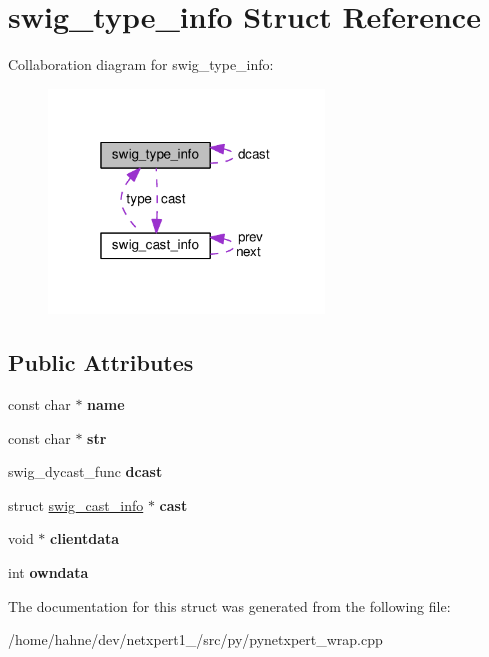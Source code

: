 \hypertarget{structswig__type__info}{}\section{swig\+\_\+type\+\_\+info Struct Reference}
\label{structswig__type__info}


Collaboration diagram for swig\+\_\+type\+\_\+info\+:\nopagebreak
\begin{figure}[H]
\begin{center}
\leavevmode
\includegraphics[width=208pt]{structswig__type__info__coll__graph}
\end{center}
\end{figure}
\subsection*{Public Attributes}
\begin{DoxyCompactItemize}
\item 
const char $\ast$ {\bfseries name}\hypertarget{structswig__type__info_a90a9c6a25aa3e923978005ecbe23ad60}{}\label{structswig__type__info_a90a9c6a25aa3e923978005ecbe23ad60}

\item 
const char $\ast$ {\bfseries str}\hypertarget{structswig__type__info_abbe7cc58a083feb4329b748643324064}{}\label{structswig__type__info_abbe7cc58a083feb4329b748643324064}

\item 
swig\+\_\+dycast\+\_\+func {\bfseries dcast}\hypertarget{structswig__type__info_a07df4bedf85be77b23756b531b60e0dd}{}\label{structswig__type__info_a07df4bedf85be77b23756b531b60e0dd}

\item 
struct \hyperlink{structswig__cast__info}{swig\+\_\+cast\+\_\+info} $\ast$ {\bfseries cast}\hypertarget{structswig__type__info_a3ee3f7ef20e965b6c798d79723a96f9b}{}\label{structswig__type__info_a3ee3f7ef20e965b6c798d79723a96f9b}

\item 
void $\ast$ {\bfseries clientdata}\hypertarget{structswig__type__info_a19bdd65dceb89cd54befd3ded06558b7}{}\label{structswig__type__info_a19bdd65dceb89cd54befd3ded06558b7}

\item 
int {\bfseries owndata}\hypertarget{structswig__type__info_a93c25d5903cbfcb82208eea7227c32bd}{}\label{structswig__type__info_a93c25d5903cbfcb82208eea7227c32bd}

\end{DoxyCompactItemize}


The documentation for this struct was generated from the following file\+:\begin{DoxyCompactItemize}
\item 
/home/hahne/dev/netxpert1\+\_/src/py/pynetxpert\+\_\+wrap.\+cpp\end{DoxyCompactItemize}
